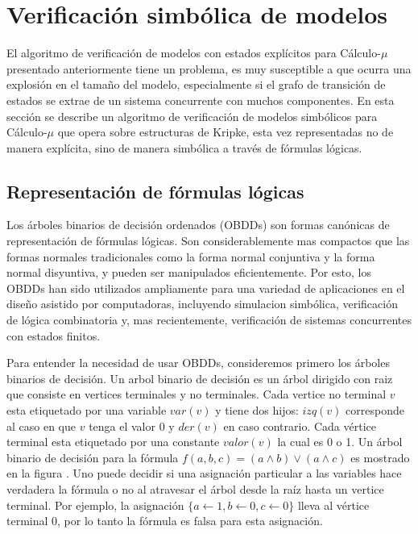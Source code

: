 \chapter{Verificación simbólica de modelos}

El algoritmo de verificación de modelos con estados explícitos para Cálculo-$\mu$ presentado anteriormente tiene un problema, es muy susceptible a que ocurra una explosión en el tamaño del modelo, especialmente si el grafo de transición de estados se extrae de un sistema concurrente con muchos componentes. En esta sección se describe un algoritmo de verificación de modelos simbólicos para Cálculo-$\mu$ que opera sobre estructuras de Kripke, esta vez representadas no de manera explícita, sino de manera simbólica a través de fórmulas lógicas.

\section{Representación de fórmulas lógicas}

Los árboles binarios de decisión ordenados (OBDDs) son formas canónicas de representación de fórmulas lógicas. Son considerablemente mas compactos que las formas normales tradicionales como la forma normal conjuntiva y la forma normal disyuntiva, y pueden ser manipulados eficientemente. Por esto, los OBDDs han sido utilizados ampliamente para una variedad de aplicaciones en el diseño asistido por computadoras, incluyendo simulacion simbólica, verificación de lógica combinatoria y, mas recientemente, verificación de sistemas concurrentes con estados finitos.

Para entender la necesidad de usar OBDDs, consideremos primero los árboles binarios de decisión. Un arbol binario de decisión es un árbol dirigido con raiz que consiste en vertices terminales y no terminales. Cada vertice no terminal $v$ esta etiquetado por una variable $var(v)$ y tiene dos hijos: $izq(v)$ corresponde al caso en que $v$ tenga el valor 0 y $der(v)$ en caso contrario. Cada vértice terminal esta etiquetado por una constante $valor(v)$ la cual es 0 o 1. Un árbol binario de decisión para la fórmula $f(a,b,c) = (a \land b) \lor (a \land c)$ es mostrado en la figura \label{fig:kripke1}. Uno puede decidir si una asignación particular a las variables hace verdadera la fórmula o no al atravesar el árbol desde la raíz hasta un vertice terminal. Por ejemplo, la asignación $\{ a \gets 1, b \gets 0, c \gets 0\}$ lleva al vértice terminal 0, por lo tanto la fórmula es falsa para esta asignación.

